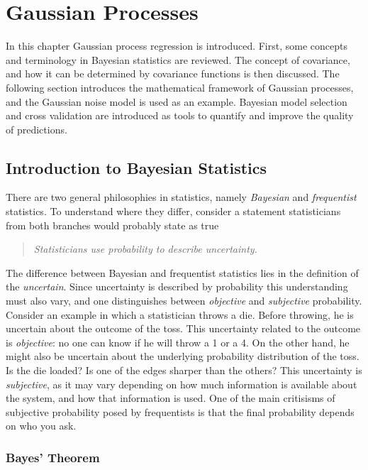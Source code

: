 \documentclass[twoside,english]{uiofysmaster}
\begin{document}
\chapter{Gaussian Processes}




In this chapter Gaussian process regression is introduced. First, some concepts and terminology in Bayesian statistics are reviewed. The concept of covariance, and how it can be determined by covariance functions is then discussed. The following section introduces the mathematical framework of Gaussian processes, and the Gaussian noise model is used as an example. Bayesian model selection and cross validation are introduced as tools to quantify and improve the quality of predictions.

\section{Introduction to Bayesian Statistics}

There are two general philosophies in statistics, namely \textit{Bayesian} and \textit{frequentist} statistics. To understand where they differ, consider a statement statisticians from both branches would probably state as true
\begin{quote}
\textit{Statisticians use probability to describe uncertainty.}
\end{quote}
The difference between Bayesian and frequentist statistics lies in the definition of the \textit{uncertain}. Since uncertainty is described by probability this understanding must also vary, and one distinguishes between \textit{objective} and \textit{subjective} probability. Consider an example in which a statistician throws a die. Before throwing, he is uncertain about the outcome of the toss. This uncertainty related to the outcome is \textit{objective}: no one can know if he will throw a 1 or a 4. On the other hand, he might also be uncertain about the underlying probability distribution of the toss. Is the die loaded? Is one of the edges sharper than the others? This uncertainty is \textit{subjective}, as it may vary depending on how much information is available about the system, and how that information is used. One of the main critisisms of subjective probability posed by frequentists is that the final probability depends on who you ask.

\subsection{Bayes' Theorem}
\end{document}
